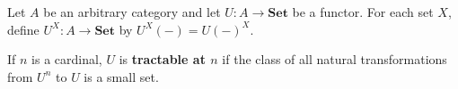 Let $A$ be an arbitrary category and let $U: A \longrightarrow \mathbf{Set}$ be a functor. For each set $X$, define $U^X: A \longrightarrow \mathbf{Set}$ by $U^X(-) = U(-)^X$.

If $n$ is a cardinal, $U$ is \textbf{tractable at $n$} if the class of all natural transformations from $U^n$ to $U$ is a small set.
